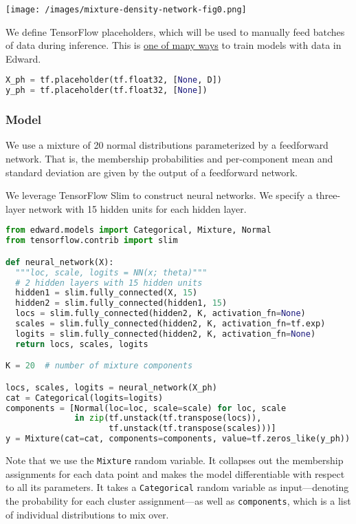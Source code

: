 \texttt{[image: /images/mixture-density-network-fig0.png]}

We define TensorFlow placeholders, which will be used to manually feed batches of data during inference. This is \href{http://edwardlib.org/api/data}{one of many ways} to train models with data in Edward.

\begin{lstlisting}[language=Python]
X_ph = tf.placeholder(tf.float32, [None, D])
y_ph = tf.placeholder(tf.float32, [None])
\end{lstlisting}

\subsubsection{Model}

We use a mixture of 20 normal distributions parameterized by a
feedforward network. That is, the membership probabilities and
per-component mean and standard deviation are given by the output of a
feedforward network.

We leverage TensorFlow Slim to construct neural networks. We specify
a three-layer network with 15 hidden units for each hidden layer.

\begin{lstlisting}[language=Python]
from edward.models import Categorical, Mixture, Normal
from tensorflow.contrib import slim

def neural_network(X):
  """loc, scale, logits = NN(x; theta)"""
  # 2 hidden layers with 15 hidden units
  hidden1 = slim.fully_connected(X, 15)
  hidden2 = slim.fully_connected(hidden1, 15)
  locs = slim.fully_connected(hidden2, K, activation_fn=None)
  scales = slim.fully_connected(hidden2, K, activation_fn=tf.exp)
  logits = slim.fully_connected(hidden2, K, activation_fn=None)
  return locs, scales, logits

K = 20  # number of mixture components

locs, scales, logits = neural_network(X_ph)
cat = Categorical(logits=logits)
components = [Normal(loc=loc, scale=scale) for loc, scale
              in zip(tf.unstack(tf.transpose(locs)),
                     tf.unstack(tf.transpose(scales)))]
y = Mixture(cat=cat, components=components, value=tf.zeros_like(y_ph))
\end{lstlisting}

Note that we use the \texttt{Mixture} random variable. It collapses
out the membership assignments for each data point and makes the model
differentiable with respect to all its parameters. It takes a
\texttt{Categorical} random variable as input—denoting the probability for each
cluster assignment—as well as \texttt{components}, which is a list of
individual distributions to mix over.


